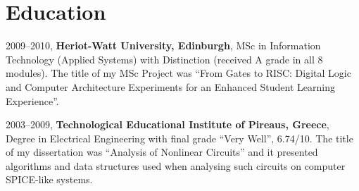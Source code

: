 \documentclass [a4paper,11pt]{article}
\newcommand{\company}[1]{{\textbf{#1}}}
\begin{document}
	\section* {Education}
		\begin {description}
		\parindent=20pt

			\item [2009--2010,] \company{Heriot-Watt University, Edinburgh},
			MSc in Information Technology (Applied Systems) with Distinction
			(received A grade in all 8 modules).  The title of my MSc Project
			was ``From Gates to RISC: Digital Logic and Computer Architecture
			Experiments for an Enhanced Student Learning Experience''.



			\item [2003--2009,] \company{Technological Educational Institute
			of Pireaus, Greece}, Degree in Electrical Engineering with final
			grade ``Very Well'', 6.74/10. The title of my dissertation was
			``Analysis of Nonlinear Circuits'' and it presented algorithms and
			data structures used when analysing such circuits on computer
			SPICE-like systems.

		 \end {description}
	
\end{document}
